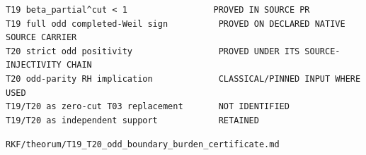 \begin{verbatim}
T19 beta_partial^cut < 1                 PROVED IN SOURCE PR
T19 full odd completed-Weil sign          PROVED ON DECLARED NATIVE SOURCE CARRIER
T20 strict odd positivity                 PROVED UNDER ITS SOURCE-INJECTIVITY CHAIN
T20 odd-parity RH implication             CLASSICAL/PINNED INPUT WHERE USED
T19/T20 as zero-cut T03 replacement       NOT IDENTIFIED
T19/T20 as independent support            RETAINED
\end{verbatim}

\begin{flushright}\small\texttt{RKF/theorum/T19\_T20\_odd\_boundary\_burden\_certificate.md}\end{flushright}
